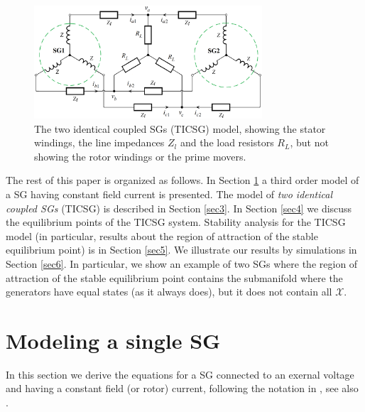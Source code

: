 \documentclass[letterpaper, 10 pt, conference]{ieeeconf}
\newcommand{\Xmscr}  {{\mathcal{X}}}
\begin{document}
\begin{figure} %
\centering \includegraphics[width=8.5cm]{full_circuit_with_2_SGs}
\caption{The two identical coupled SGs (TICSG) model, showing the 
stator windings, the line impedances $Z_l$ and the load resistors 
$R_L$, but not showing the rotor windings or the prime movers.}
\label{fig:TICSGThreePhase}
\end{figure}

The rest of this paper is organized as follows. In Section \ref{sec2}
a third order model of a SG having constant field current is
presented. The model of {\em two identical coupled SGs} (TICSG) is
described in Section \ref{sec3}. In Section \ref{sec4} we discuss the 
equilibrium points of the TICSG system. Stability analysis for the
TICSG model (in particular, results about the region of attraction of
the stable equilibrium point) is in Section \ref{sec5}. We illustrate
our results by simulations in Section \ref{sec6}. In particular, we 
show an example of two SGs where the region of attraction of the 
stable equilibrium point contains the submanifold where the 
generators have equal states (as it always does), but it does not 
contain all $\Xmscr$.

\section{Modeling a single SG} \label{sec2} %

In this section we derive the equations for a SG connected to an
exernal voltage and having a constant field (or rotor) current,
following the notation in \cite{ZhWe:11}, see also \cite{NaWe:15}.
\end{document}
